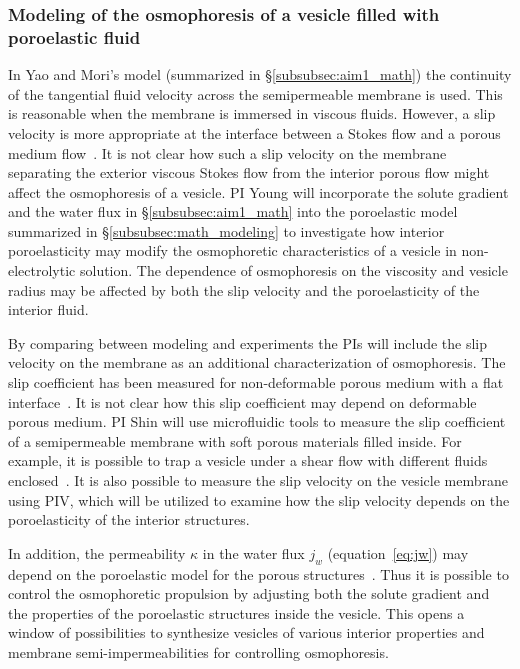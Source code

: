 \documentclass[11pt]{article}
\begin{document}
 
\subsubsection{Modeling of the osmophoresis of a vesicle filled with
poroelastic fluid\label{subsubsec:math_model_porous_vesicle}}
In Yao and Mori's model (summarized in \S \ref{subsubsec:aim1_math}) the
continuity of the tangential fluid velocity across the semipermeable
membrane is used.  This is reasonable when the membrane is immersed in
viscous fluids.  However, a slip velocity is more appropriate at the
interface between a Stokes flow and a porous medium
flow~\cite{MacMinn2016_PRApplied, Angot2017_PRE}.  It is not clear how
such a slip velocity on the membrane separating the exterior viscous
Stokes flow from the interior porous flow might affect the osmophoresis
of a vesicle.  PI Young will incorporate the solute gradient and the
water flux in \S \ref{subsubsec:aim1_math} into the poroelastic model
summarized in \S \ref{subsubsec:math_modeling} to investigate how
interior poroelasticity may modify the osmophoretic characteristics of a
vesicle in non-electrolytic solution.  The dependence of osmophoresis on
the viscosity and vesicle radius may be affected by both the slip
velocity and the poroelasticity of the interior fluid. 

By comparing between modeling and experiments the PIs will include the
slip velocity on the membrane as an additional characterization of
osmophoresis. The slip coefficient has been measured for non-deformable
porous medium with a flat interface~\cite{BeaversJoseph1967_JFM,
LaugaBrennerStone2007_chapter19,  LaugaStone2003_JFM}.  It is not clear
how this slip coefficient may depend on deformable porous medium. PI
Shin will use microfluidic tools to measure the slip coefficient of a
semipermeable membrane with soft porous materials filled inside. For
example, it is possible to trap a vesicle under a shear flow with
different fluids enclosed~\cite{shin2015}. It is also possible to
measure the slip velocity on the vesicle membrane using PIV, which will
be utilized to examine how the slip velocity depends on the
poroelasticity of the interior structures.

In addition, the permeability $\kappa$ in the water flux $j_w$
(equation~\eqref{eq:jw}) may depend on the poroelastic model for the
porous structures~\cite{MacMinn2016_PRApplied}.  Thus it is possible to
control the osmophoretic propulsion by adjusting both the solute
gradient and the  properties of the poroelastic structures inside the
vesicle. This opens a window of possibilities to synthesize vesicles of
various interior properties and membrane semi-impermeabilities for
controlling osmophoresis.
\end{document}

